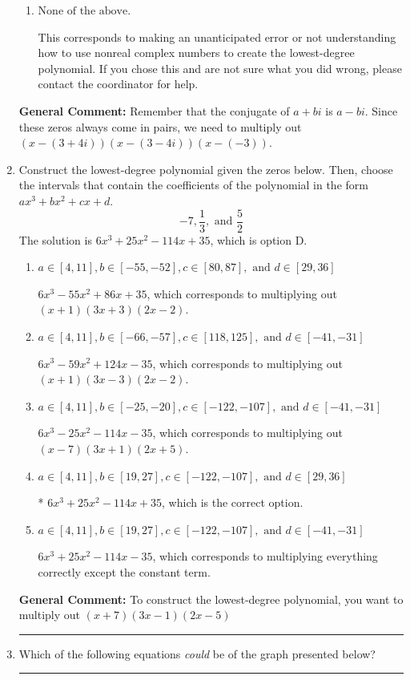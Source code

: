 \documentclass{extbook}[14pt]
\newcommand{\litem}[1]{\item #1

\rule{\textwidth}{0.4pt}}
\begin{document}
\begin{enumerate}
{\begin{enumerate}[label=\Alph*.]
$x^{3} + x^{2} -x -12$, which corresponds to multiplying out $(x -4)(x + 3)$.
\item \( \text{None of the above.} \)

This corresponds to making an unanticipated error or not understanding how to use nonreal complex numbers to create the lowest-degree polynomial. If you chose this and are not sure what you did wrong, please contact the coordinator for help.
\end{enumerate}

\textbf{General Comment:} Remember that the conjugate of $a+bi$ is $a-bi$. Since these zeros always come in pairs, we need to multiply out $(x-(3 + 4 i))(x-(3 - 4 i))(x-(-3))$.
}
\litem{
Construct the lowest-degree polynomial given the zeros below. Then, choose the intervals that contain the coefficients of the polynomial in the form $ax^3+bx^2+cx+d$.
\[ -7, \frac{1}{3}, \text{ and } \frac{5}{2} \]
The solution is \( 6x^{3} +25 x^{2} -114 x + 35 \), which is option D.\begin{enumerate}[label=\Alph*.]
\item \( a \in [4, 11], b \in [-55, -52], c \in [80, 87], \text{ and } d \in [29, 36] \)

$6x^{3} -55 x^{2} +86 x + 35$, which corresponds to multiplying out $(x + 1)(3x + 3)(2x -2)$.
\item \( a \in [4, 11], b \in [-66, -57], c \in [118, 125], \text{ and } d \in [-41, -31] \)

$6x^{3} -59 x^{2} +124 x -35$, which corresponds to multiplying out $(x + 1)(3x -3)(2x -2)$.
\item \( a \in [4, 11], b \in [-25, -20], c \in [-122, -107], \text{ and } d \in [-41, -31] \)

$6x^{3} -25 x^{2} -114 x -35$, which corresponds to multiplying out $(x -7)(3x + 1)(2x + 5)$.
\item \( a \in [4, 11], b \in [19, 27], c \in [-122, -107], \text{ and } d \in [29, 36] \)

* $6x^{3} +25 x^{2} -114 x + 35$, which is the correct option.
\item \( a \in [4, 11], b \in [19, 27], c \in [-122, -107], \text{ and } d \in [-41, -31] \)

$6x^{3} +25 x^{2} -114 x -35$, which corresponds to multiplying everything correctly except the constant term.
\end{enumerate}

\textbf{General Comment:} To construct the lowest-degree polynomial, you want to multiply out $(x + 7)(3x -1)(2x -5)$
}
\litem{
Which of the following equations \textit{could} be of the graph presented below?

}
\end{enumerate}
\end{document}
